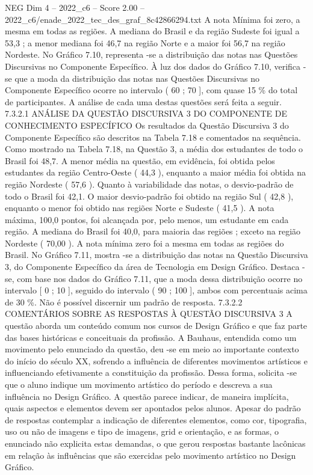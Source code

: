 \begin{textsample}{NEG Dim 4 – 2022\_c6 – Score 2.00 – 2022\_c6/enade\_2022\_tec\_des\_graf\_8c42866294.txt}
A nota Mínima foi zero, a mesma em todas as regiões.
A mediana do Brasil e da região Sudeste foi igual a 53,3 ; a menor mediana foi 46,7 na região Norte e a maior foi 56,7 na região Nordeste.
No Gráfico 7.10, representa -se a distribuição das notas nas Questões Discursivas no Componente Específico.
À luz dos dados do Gráfico 7.10, verifica -se que a moda da distribuição das notas nas Questões Discursivas no Componente Específico ocorre no intervalo ( 60 ; 70 ], com quase 15 \% do total de participantes.
A análise de cada uma destas questões será feita a seguir. 7.3.2.1 ANÁLISE DA QUESTÃO DISCURSIVA 3 DO COMPONENTE DE CONHECIMENTO ESPECÍFICO Os resultados da Questão Discursiva 3 do Componente Específico são descritos na Tabela 7.18 e comentados na sequência.
Como mostrado na Tabela 7.18, na Questão 3, a média dos estudantes de todo o Brasil foi 48,7.
A menor média na questão, em evidência, foi obtida pelos estudantes da região Centro-Oeste ( 44,3 ), enquanto a maior média foi obtida na região Nordeste ( 57,6 ).
Quanto à variabilidade das notas, o desvio-padrão de todo o Brasil foi 42,1.
O maior desvio-padrão foi obtido na região Sul ( 42,8 ), enquanto o menor foi obtido nas regiões Norte e Sudeste ( 41,5 ).
A nota máxima, 100,0 pontos, foi alcançada por, pelo menos, um estudante em cada região.
A mediana do Brasil foi 40,0, para maioria das regiões ; exceto na região Nordeste ( 70,00 ).
A nota mínima zero foi a mesma em todas as regiões do Brasil.
No Gráfico 7.11, mostra -se a distribuição das notas na Questão Discursiva 3, do Componente Específico da área de Tecnologia em Design Gráfico.
Destaca -se, com base nos dados do Gráfico 7.11, que a moda dessa distribuição ocorre no intervalo [ 0 ; 10 ], seguido do intervalo ( 90 ; 100 ], ambos com percentuais acima de 30 \%.
Não é possível discernir um padrão de resposta. 7.3.2.2 COMENTÁRIOS SOBRE AS RESPOSTAS À QUESTÃO DISCURSIVA 3 A questão aborda um conteúdo comum nos cursos de Design Gráfico e que faz parte das bases históricas e conceituais da profissão.
A Bauhaus, entendida como um movimento pelo enunciado da questão, deu -se em meio ao importante contexto do início do século XX, sofrendo a influência de diferentes movimentos artísticos e influenciando efetivamente a constituição da profissão.
Dessa forma, solicita -se que o aluno indique um movimento artístico do período e descreva a sua influência no Design Gráfico.
A questão parece indicar, de maneira implícita, quais aspectos e elementos devem ser apontados pelos alunos.
Apesar do padrão de respostas contemplar a indicação de diferentes elementos, como cor, tipografia, uso ou não de imagens e tipo de imagens, grid e orientação, e as formas, o enunciado não explicita estas demandas, o que gerou respostas bastante lacônicas em relação às influências que são exercidas pelo movimento artístico no Design Gráfico.

\end{textsample}
